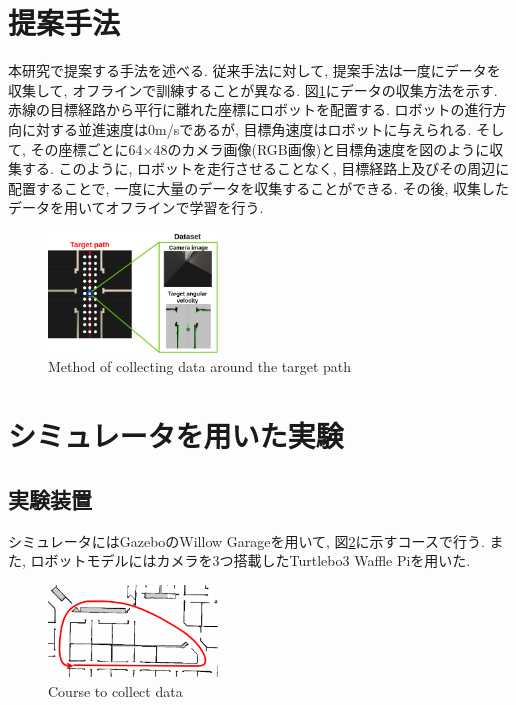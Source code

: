 \documentclass{ujarticle}
\begin{document}
\newpage
\section{提案手法}%
本研究で提案する手法を述べる. 従来手法に対して, 提案手法は一度にデータを収集して, オフラインで訓練することが異なる. 図\ref{Fig:collect}にデータの収集方法を示す. 赤線の目標経路から平行に離れた座標にロボットを配置する. ロボットの進行方向に対する並進速度は0m/sであるが, 目標角速度はロボットに与えられる. そして, その座標ごとに64×48のカメラ画像(RGB画像)と目標角速度を図のように収集する. このように, ロボットを走行させることなく, 目標経路上及びその周辺に配置することで, 一度に大量のデータを収集することができる. その後, 収集したデータを用いてオフラインで学習を行う.

\begin{figure}[h]
		\centering
		\includegraphics[width=0.4\textwidth]{img/proposed.png}
		\caption{Method of collecting data around the target path}
		\label{Fig:collect}
\end{figure}

\section{シミュレータを用いた実験}%
\subsection{実験装置}シミュレータにはGazebo\cite{gazebo}のWillow Garage\cite{willow}を用いて, 図\ref{Fig:willow}に示すコースで行う. また, ロボットモデルにはカメラを3つ搭載したTurtlebo3 Waffle Pi\cite{turtlebot3}を用いた. 

\begin{figure}[t]
		\centering
		\includegraphics[width=0.4\textwidth]{img/willow-path.png}
		\caption{Course to collect data}
		\label{Fig:willow}
\end{figure}
\end{document}
